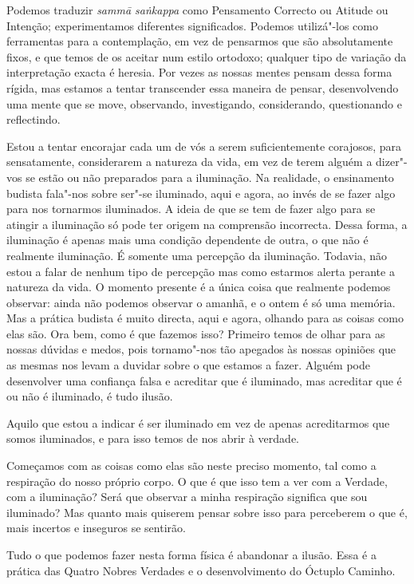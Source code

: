 Podemos traduzir \emph{sammā saṅkappa} como Pensamento Correcto ou Atitude ou
Intenção; experimentamos diferentes significados. Podemos utilizá"-los como
ferramentas para a contemplação, em vez de pensarmos que são absolutamente
fixos, e que temos de os aceitar num estilo ortodoxo; qualquer tipo de variação
da interpretação exacta é heresia. Por vezes as nossas mentes pensam dessa forma
rígida, mas estamos a tentar transcender essa maneira de pensar, desenvolvendo
uma mente que se move, observando, investigando, considerando, questionando e
reflectindo.

Estou a tentar encorajar cada um de vós a serem suficientemente corajosos, para
sensatamente, considerarem a natureza da vida, em vez de terem alguém a
dizer"-vos se estão ou não preparados para a iluminação. Na realidade, o
ensinamento budista fala"-nos sobre ser"-se iluminado, aqui e agora, ao invés de
se fazer algo para nos tornarmos iluminados. A ideia de que se tem de fazer algo
para se atingir a iluminação só pode ter origem na comprensão incorrecta.
Dessa forma, a iluminação é apenas mais uma condição dependente de outra, o que
não é realmente iluminação. É somente uma percepção da iluminação. Todavia, não
estou a falar de nenhum tipo de percepção mas como estarmos alerta perante a natureza da vida. O momento presente é a única coisa que realmente podemos
observar: ainda não podemos observar o amanhã, e o ontem é só uma memória. Mas a
prática budista é muito directa, aqui e agora, olhando para as coisas como elas
são. Ora bem, como é que fazemos isso? Primeiro temos de olhar para as nossas
dúvidas e medos, pois tornamo"-nos tão apegados às nossas opiniões que as mesmas
nos levam a duvidar sobre o que estamos a fazer. Alguém pode desenvolver uma confiança falsa e acreditar que é iluminado, mas acreditar que é ou não é
iluminado, é tudo ilusão.

Aquilo que estou a indicar é ser iluminado em vez de apenas acreditarmos que
somos iluminados, e para isso temos de nos abrir à verdade.

Começamos com as coisas como elas são neste preciso momento, tal como a
respiração do nosso próprio corpo. O que é que isso tem a ver com a Verdade, com
a iluminação? Será que observar a minha respiração significa que sou iluminado?
Mas quanto mais quiserem pensar sobre isso para perceberem o que é, mais
incertos e inseguros se sentirão.

Tudo o que podemos fazer nesta forma física é abandonar a ilusão. Essa é a
prática das Quatro Nobres Verdades e o desenvolvimento do Óctuplo Caminho.

